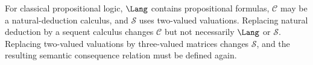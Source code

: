 \begin{example}
For classical propositional logic, \(\Lang\) contains propositional formulas,
\(\mathcal C\) may be a natural-deduction calculus, and \(\mathcal S\) uses
two-valued valuations.  Replacing natural deduction by a sequent calculus
changes \(\mathcal C\) but not necessarily \(\Lang\) or \(\mathcal S\).
Replacing two-valued valuations by three-valued matrices changes
\(\mathcal S\), and the resulting semantic consequence relation must be
defined again.
\end{example}

